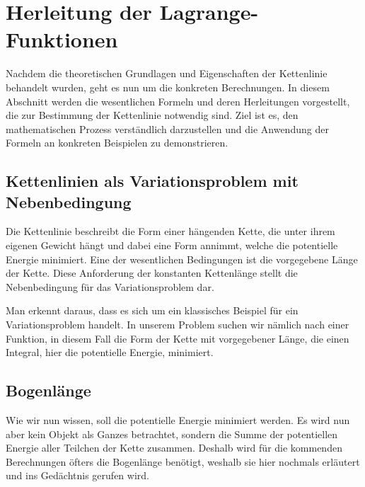 %
%
%
%
\section{Herleitung der Lagrange-Funktionen\label{kettenlinie:section:Herleitung der Lagrange-Funktionen}}
Nachdem die theoretischen Grundlagen und Eigenschaften der Kettenlinie behandelt wurden, geht es nun um die konkreten Berechnungen.
In diesem Abschnitt werden die wesentlichen Formeln und deren Herleitungen vorgestellt, die zur Bestimmung der Kettenlinie notwendig sind.
Ziel ist es, den mathematischen Prozess verständlich darzustellen und die Anwendung der Formeln an konkreten Beispielen zu demonstrieren.

\subsection{Kettenlinien als Variationsproblem mit Nebenbedingung
\label{kettenlinie:subsection:Kettenlinien als Variationsproblem mit Nebenbedingung}}
Die Kettenlinie beschreibt die Form einer hängenden Kette, die unter ihrem eigenen Gewicht hängt und dabei eine Form annimmt, welche die potentielle Energie minimiert.
Eine der wesentlichen Bedingungen ist die vorgegebene Länge der Kette.
Diese Anforderung der konstanten Kettenlänge stellt die Nebenbedingung für das Variationsproblem dar.

Man erkennt daraus, dass es sich um ein klassisches Beispiel für ein Variationsproblem handelt.
In unserem Problem suchen wir nämlich nach einer Funktion, in diesem Fall die Form der Kette mit vorgegebener Länge, die einen Integral, hier die potentielle Energie, minimiert.

\subsection{Bogenlänge
\label{kettenlinie:subsection:Bogenlänge}}
Wie wir nun wissen, soll die potentielle Energie minimiert werden.
Es wird nun aber kein Objekt als Ganzes betrachtet, sondern die Summe der potentiellen Energie aller Teilchen der Kette zusammen.
Deshalb wird für die kommenden Berechnungen öfters die Bogenlänge benötigt, weshalb sie hier nochmals erläutert und ins Gedächtnis gerufen wird.

